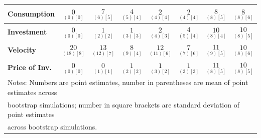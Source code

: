 \documentclass{article}
\begin{document}
\begin{tabular}{|l|c|@{}c|c|@{}c|c|@{}c|c|}
 \textbf{Consumption} & $\underset{(  0) [  0]}{  0}$ & $\underset{(  6) [  5]}{  7}$ & $\underset{(  5) [  4]}{  4}$ & $\underset{(  4) [  4]}{  2}$ & $\underset{(  4) [  4]}{  2}$ & $\underset{(  8) [  5]}{  8}$ & $\underset{(  8) [  6]}{  8}$ \\ \hline 
 \textbf{Investment} & $\underset{(  0) [  0]}{  0}$ & $\underset{(  2) [  2]}{  1}$ & $\underset{(  3) [  3]}{  1}$ & $\underset{(  4) [  3]}{  2}$ & $\underset{(  5) [  4]}{  4}$ & $\underset{(  8) [  4]}{ 10}$ & $\underset{(  8) [  5]}{ 10}$ \\ \hline 
 \textbf{Velocity} & $\underset{( 18) [  8]}{ 20}$ & $\underset{( 12) [  7]}{ 13}$ & $\underset{(  9) [  4]}{  8}$ & $\underset{( 11) [  6]}{ 12}$ & $\underset{(  7) [  6]}{  7}$ & $\underset{(  9) [  5]}{ 11}$ & $\underset{(  8) [  6]}{ 10}$ \\ \hline 
 \textbf{Price of Inv.} & $\underset{(  0) [  0]}{  0}$ & $\underset{(  1) [  1]}{  0}$ & $\underset{(  2) [  2]}{  1}$ & $\underset{(  3) [  2]}{  1}$ & $\underset{(  3) [  3]}{  1}$ & $\underset{(  8) [  5]}{ 11}$ & $\underset{(  8) [  5]}{ 10}$ \\ \hline 
 \multicolumn{8}{|l|}{Notes: Numbers are point estimates, number in 
 parentheses are mean of point estimates across} \\ \hline 
 \multicolumn{8}{|l|}{bootstrap simulations; number in square brackets are 
 standard deviation of point estimates} \\ \hline 
 \multicolumn{8}{|l|}{across bootstrap simulations.} \\ \hline 
 \end{tabular} 
\end{document}
